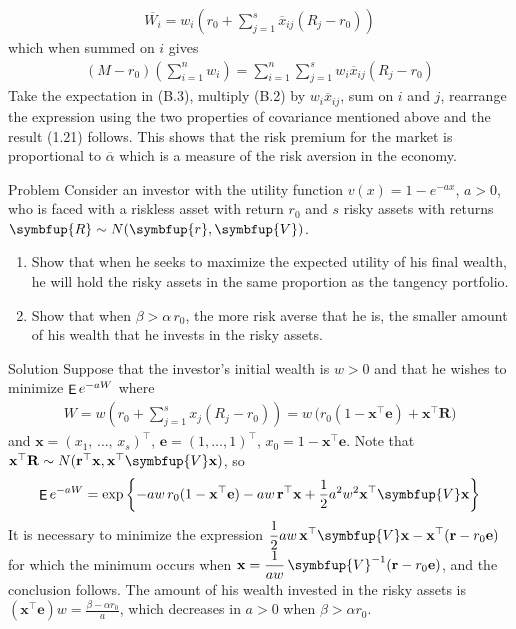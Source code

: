\documentclass[10pt]{beamer}
\newcommand{\ds}{\displaystyle}
\newcommand{\vR}{\symbfup{R}}
\newcommand{\vV}{\symbfup{V}}
\newcommand{\vr}{\symbfup{r}}
\DeclareMathOperator\expc{{\sf E}}
\theoremstyle{definition}
\begin{document}
\begin{frame}[allowframebreaks]
\begin{align*}
    \overline{W_i} = w_i\left(r_0 + \sum_{j=1}^s \overline{x}_{ij}(R_j - r_0)\right)
  \end{align*}
  which when summed on $i$ gives
  \begin{align*}
    (M - r_0)\left(\sum_{i=1}^n w_i\right) = \sum_{i=1}^n\sum_{j=1}^s w_i\overline{x}_{ij}(R_j - r_0)
  \end{align*}
  Take the expectation in (B.3), multiply (B.2) by $w_i\overline{x}_{ij}$, sum on $i$ and $j$, rearrange the expression using the two properties of covariance mentioned above and the result (1.21) follows. This shows that the risk premium for the market is proportional to $\overline{\alpha}$ which is a measure of the risk aversion in the economy.
\end{frame}

\begin{frame}{Problem}
  Consider an investor with the utility function $v(x) = 1 - e^{-ax}$, $a > 0$, who is faced with a riskless asset with return $r_0$ and $s$ risky assets with returns $\vR\sim N(\vr, \vV)$. 
  \begin{enumerate}
    \item Show that when he seeks to maximize the expected utility of his final wealth, he will hold the risky assets in the same proportion as the tangency portfolio.
    \item Show that when $\beta > \alpha\,r_0$, the more risk averse that he is, the smaller amount of his wealth that he invests in the risky assets.
  \end{enumerate}
\end{frame}

\begin{frame}{Solution}
  Suppose that the investor's initial wealth is $w > 0$ and that he wishes to minimize $\expc{e^{-aW}}$ where
  \begin{align*}
    W = w\left(r_0 + \sum_{j=1}^s x_j(R_j - r_0)\right) = w\,\big(r_0(1-\mathbf{x}^\top\mathbf{e}) + \mathbf{x}^\top\mathbf{R}\big)
  \end{align*}
  and $\mathbf{x} = (x_1,\,\ldots,\,x_s)^\top$, $\mathbf{e} = (1,\ldots,1)^\top$, $x_0 = 1 - \mathbf{x}^\top\mathbf{e}$. Note that $\mathbf{x}^\top\mathbf{R}\sim N(\mathbf{r}^\top\mathbf{x}, \mathbf{x}^\top\vV\mathbf{x})$, so 
  \begin{align*}
    \expc{e^{-aW}} = \exp\left\{-aw\,r_0(1-\mathbf{x}^\top\mathbf{e}) - aw\,\mathbf{r}^\top\mathbf{x} + \frac{1}{2}a^2w^2\mathbf{x}^\top\vV\mathbf{x}\right\}
  \end{align*}
  It is necessary to minimize the expression $\ds\frac{1}{2}aw\,\mathbf{x}^\top\vV\mathbf{x} - \mathbf{x}^\top(\mathbf{r} - r_0\mathbf{e})$ for which the minimum occurs when $\ds\mathbf{x} = \frac{1}{aw}\,\vV^{-1}(\mathbf{r} - r_0\mathbf{e})$, and the conclusion follows. The amount of his wealth invested in the risky assets is $\ds(\mathbf{x}^\top\mathbf{e})w = \frac{\beta - \alpha r_0}{a}$, which decreases in $a > 0$ when $\beta > \alpha r_0$.
\end{frame}
\end{document}

